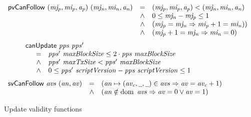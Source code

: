 \begin{figure}[htb]
  \begin{equation}
    \label{eq:func:pv-can-follow}
    \begin{array}{r c l}
      \mathsf{pvCanFollow}~(\mathit{mj_p}, \mathit{mi_p}, \mathit{a_p})~(\mathit{mj_n}, \mathit{mi_n}, \mathit{a_n})
      & = & (\mathit{mj_p}, \mathit{mi_p}, \mathit{a_p}) < (\mathit{mj_n}, \mathit{mi_n}, \mathit{a_n})\\
      & \wedge & 0 \leq \mathit{mj_n} - \mathit{mj_p} \leq 1\\
      & \wedge & (\mathit{mj_p} = \mathit{mj_n} \Rightarrow \mathit{mi_p} + 1 = \mathit{mi_n}))\\
      & \wedge & (\mathit{mj_p} + 1 = \mathit{mj_n} \Rightarrow \mathit{mi_n} = 0)
    \end{array}
  \end{equation}
  \nextdef
  \begin{equation}
    \label{eq:func:can-update}
    \begin{array}{l}
      \mathsf{canUpdate}~\mathit{pps}~\mathit{pps'}\\
      {\begin{array}{r c l}
         & = & \mathit{pps'}~\mathit{maxBlockSize} \leq 2\cdot\mathit{pps}~\mathit{maxBlockSize}\\
         & \wedge & \mathit{pps'}~\mathit{maxTxSize} < \mathit{pps'}~\mathit{maxBlockSize} \\
         & \wedge
             & 0 \leq
               \mathit{pps'}~\mathit{scriptVersion} - \mathit{pps}~\mathit{scriptVersion}
               \leq 1
       \end{array}}
    \end{array}
  \end{equation}
  \nextdef
  \begin{equation}
    \label{eq:func:av-can-follow}
    \begin{array}{r c l}
      \fun{svCanFollow}~\var{avs}~(\var{an}, \var{av}) & =
      & (\var{an} \mapsto (\var{av_c}, \wcard, \wcard) \in \var{avs}
        \Rightarrow \var{av} = \var{av_c} + 1)\\
      & \wedge & (\var{an} \notin \dom~\var{avs} \Rightarrow \var{av} = 0 \vee \var{av} = 1)
    \end{array}
  \end{equation}
  \caption{Update validity functions}
\end{figure}

